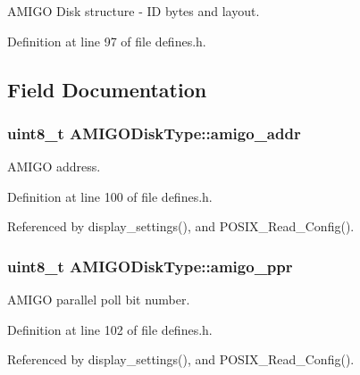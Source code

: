 A\+M\+I\+GO Disk structure -\/ ID bytes and layout. 

Definition at line 97 of file defines.\+h.



\subsection{Field Documentation}
\subsubsection[{\texorpdfstring{amigo\+\_\+addr}{amigo_addr}}]{\setlength{\rightskip}{0pt plus 5cm}uint8\+\_\+t A\+M\+I\+G\+O\+Disk\+Type\+::amigo\+\_\+addr}\hypertarget{structAMIGODiskType_a83024d746078dbf1b35e63fa38b9185c}{}\label{structAMIGODiskType_a83024d746078dbf1b35e63fa38b9185c}


A\+M\+I\+GO address. 



Definition at line 100 of file defines.\+h.



Referenced by display\+\_\+settings(), and P\+O\+S\+I\+X\+\_\+\+Read\+\_\+\+Config().

\subsubsection[{\texorpdfstring{amigo\+\_\+ppr}{amigo_ppr}}]{\setlength{\rightskip}{0pt plus 5cm}uint8\+\_\+t A\+M\+I\+G\+O\+Disk\+Type\+::amigo\+\_\+ppr}\hypertarget{structAMIGODiskType_abf1e4513e84f8f4598577e20151f1e2d}{}\label{structAMIGODiskType_abf1e4513e84f8f4598577e20151f1e2d}


A\+M\+I\+GO parallel poll bit number. 



Definition at line 102 of file defines.\+h.



Referenced by display\+\_\+settings(), and P\+O\+S\+I\+X\+\_\+\+Read\+\_\+\+Config().

